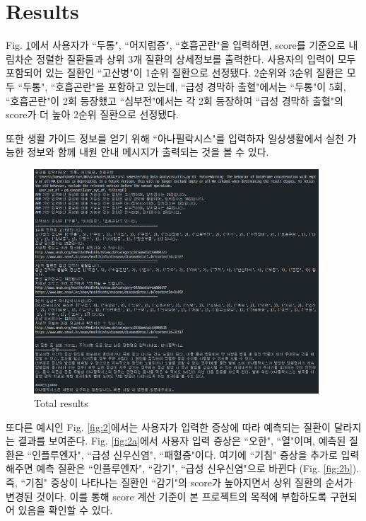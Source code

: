 \documentclass[conference]{IEEEtran}
\begin{document}
\section{Results}
Fig. \ref{fig:1}에서 사용자가 ``두통", ``어지럼증", ``호흡곤란"을 입력하면, score를 기준으로 내림차순 정렬한 질환들과 상위 3개 질환의 상세정보를 출력한다. 사용자의 입력이 모두 포함되어 있는 질환인 ``고산병"이  1순위 질환으로 선정됐다. 2순위와 3순위 질환은 모두 ``두통", ``호흡곤란"을 포함하고 있는데, ``급성 경막하 출혈"에서는 ``두통"이 5회, ``호흡곤란"이 2회 등장했고 ``심부전"에서는 각 2회 등장하여 ``급성 경막하 출혈"의 score가 더 높아 2순위 질환으로 선정됐다.

또한 생활 가이드 정보를 얻기 위해 ``아나필락시스"를 입력하자 일상생활에서 실천 가능한 정보와 함께 내원 안내 메시지가 출력되는 것을 볼 수 있다.
\begin{figure}
\centerline{\includegraphics[width=0.95\textwidth]{temp.png}}
\caption{Total results}
\label{fig:1}
\end{figure}

또다른 예시인 Fig. \ref{fig:2}에서는 사용자가 입력한 증상에 따라 예측되는 질환이 달라지는 결과를 보여준다. Fig. \ref{fig:2a}에서 사용자 입력 증상은 ``오한", ``열"이며, 예측된 질환은 ``인플루엔자", ``급성 신우신염", ``패혈증"이다. 여기에 ``기침" 증상을 추가로 입력해주면 예측 질환은 ``인플루엔자", ``감기", ``급성 신우신염"으로 바뀐다 (Fig. \ref{fig:2b}). 즉, ``기침" 증상이 나타나는 질환인 ``감기"의 score가 높아지면서 상위 질환의 순서가 변경된 것이다. 이를 통해 score 계산 기준이 본 프로젝트의 목적에 부합하도록 구현되어 있음을 확인할 수 있다.
\end{document}
